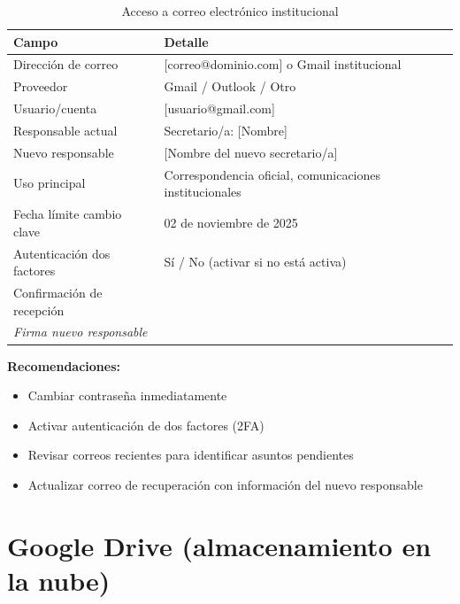 \begin{table}[H]
\centering
\caption{Acceso a correo electrónico institucional}
\label{tab:acceso-correo}
\begin{tabularx}{\textwidth}{@{}lX@{}}
\toprule
\textbf{Campo} & \textbf{Detalle} \\
\midrule
Dirección de correo & [correo@dominio.com] o Gmail institucional \\
Proveedor & Gmail / Outlook / Otro \\
Usuario/cuenta & [usuario@gmail.com] \\
Responsable actual & Secretario/a: [Nombre] \\
Nuevo responsable & [Nombre del nuevo secretario/a] \\
Uso principal & Correspondencia oficial, comunicaciones institucionales \\
Fecha límite cambio clave & 02 de noviembre de 2025 \\
Autenticación dos factores & Sí / No (activar si no está activa) \\
Confirmación de recepción & \underline{\hspace{5cm}} \\ \emph{Firma nuevo responsable} \\
\bottomrule
\end{tabularx}
\end{table}

\textbf{Recomendaciones:}
\begin{itemize}
  \item Cambiar contraseña inmediatamente
  \item Activar autenticación de dos factores (2FA)
  \item Revisar correos recientes para identificar asuntos pendientes
  \item Actualizar correo de recuperación con información del nuevo responsable
\end{itemize}

\section{Google Drive (almacenamiento en la nube)}

